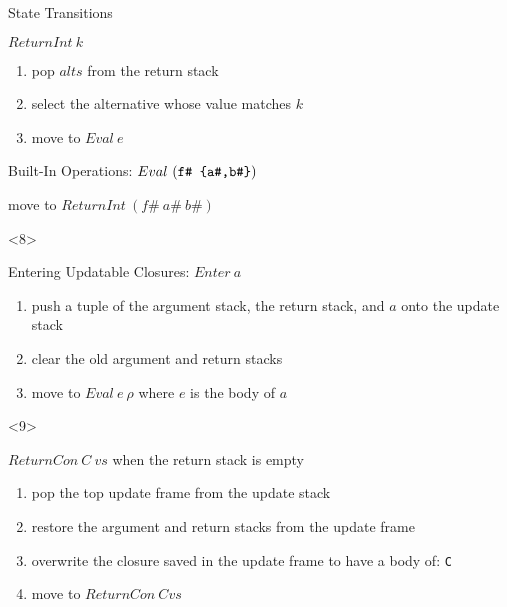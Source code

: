 \documentclass{beamer}
\begin{document}
\begin{frame}[fragile]{State Transitions}
\begin{onlyenv}
    \begin{block}{$ReturnInt\ k$}
      \begin{enumerate}
      \item pop $alts$ from the return stack
      \item select the alternative whose value matches $k$
      \item move to $Eval\ e$
      \end{enumerate}
    \end{block}

    \begin{block}{Built-In Operations:
        $Eval\ (\texttt{f\# \string{a\#,b\#\string}})$}

      move to $ReturnInt\ (f\#\ a\#\ b\#)$
    \end{block}
  \end{onlyenv}

  \begin{onlyenv}<8>
    \begin{block}{Entering Updatable Closures: $Enter\ a$}
      \begin{enumerate}
      \item push a tuple of the argument stack, the return stack, and $a$ onto
        the update stack
      \item clear the old argument and return stacks
      \item move to $Eval\ e\ \rho$ where $e$ is the body of $a$
      \end{enumerate}
    \end{block}
  \end{onlyenv}

  \begin{onlyenv}<9>
    \begin{block}{$ReturnCon\ C\ vs$ when the return stack is empty}
      \begin{enumerate}
      \item pop the top update frame from the update stack
      \item restore the argument and return stacks from the update frame
      \item overwrite the closure saved in the update frame to have a body of:
        \texttt{C }
      \item move to $ReturnCon\ C vs$
      \end{enumerate}
    \end{block}
  \end{onlyenv}


\end{frame}
\end{document}
